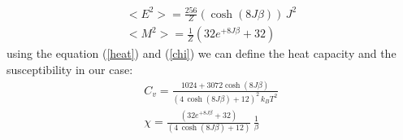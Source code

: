 \documentclass[%
preprint,
 amsmath,amssymb,
 aps,
]{revtex4-1}
\theoremstyle{plain}
\theoremstyle{definition}
\theoremstyle{plain}
\begin{document}
\begin{equation}
\begin{split}
<E^2> =\frac{256}{Z} (\cosh(8J\beta)) \, J^2 \\
<M^2> =  \frac{1}{Z} (32e^{+8J\beta} + 32)
\end{split}
\end{equation}
using the equation (\ref{heat}) and (\ref{chi}) we can define the heat capacity and the susceptibility in our case:
\begin{equation}
\begin{split}
C_v = \frac{1024 +3072 \cosh(8J\beta)}{(4\, \cosh(8J\beta)+12)^2 \, k_B T^2} \\
\chi = \frac{(32e^{+8J\beta} + 32)}{(4\, \cosh(8J\beta)+12)} \, \frac{1}{\beta}
\end{split}
\end{equation}
\end{document}

